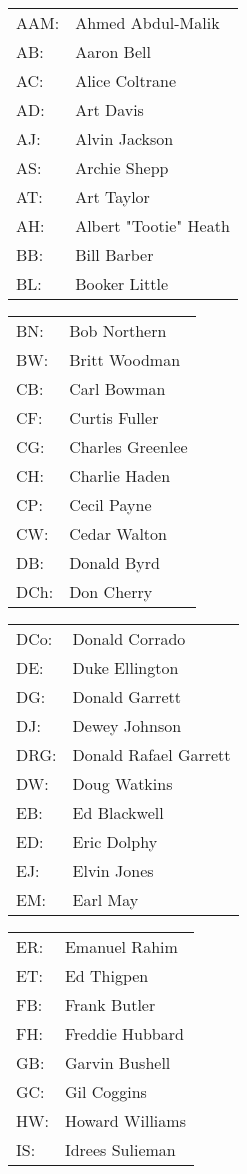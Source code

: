 \documentclass[a4paper, landscape]{article}
\begin{document}
\vfill

{\small
\newcommand{\split}{\end{tabular}\hfill\begin{tabular}{@{}l@{~}l@{}}}
\begin{tabular}{@{}l@{~}l@{}}

AAM:&Ahmed Abdul-Malik\\
AB:&Aaron Bell\\
AC:&Alice Coltrane\\
AD:&Art Davis\\
AJ:&Alvin Jackson\\
AS:&Archie Shepp\\
AT:&Art Taylor\\
AH:&Albert "Tootie" Heath\\
BB:&Bill Barber\\
BL:&Booker Little\\\split
BN:&Bob Northern\\
BW:&Britt Woodman\\
CB:&Carl Bowman\\
CF:&Curtis Fuller\\
CG:&Charles Greenlee\\
CH:&Charlie Haden\\
CP:&Cecil Payne\\
CW:&Cedar Walton\\
DB:&Donald Byrd\\
DCh:&Don Cherry\\\split
DCo:&Donald Corrado\\
DE:&Duke Ellington\\
DG:&Donald Garrett\\
DJ:&Dewey Johnson\\
DRG:&Donald Rafael Garrett\\
DW:&Doug Watkins\\
EB:&Ed Blackwell\\
ED:&Eric Dolphy\\
EJ:&Elvin Jones\\
EM:&Earl May\\\split
ER:&Emanuel Rahim\\
ET:&Ed Thigpen\\
FB:&Frank Butler\\
FH:&Freddie Hubbard\\
GB:&Garvin Bushell\\
GC:&Gil Coggins\\
HW:&Howard Williams\\
IS:&Idrees Sulieman\\

\end{tabular}}
\end{document}
